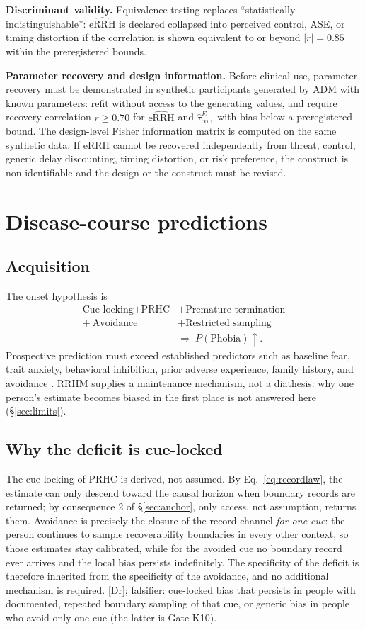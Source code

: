 \documentclass[9pt,twocolumn]{article}
\newcommand{\eRRHhat}{\widehat{\mathrm{eRRH}}}
\newcommand{\tcorr}{\widehat{\tau}^{E}_{\mathrm{corr}}}
\newcommand{\tier}[1]{{\sffamily\scriptsize\color{RRHMSlate}[#1]}}
\begin{document}
\textbf{Discriminant validity.} Equivalence testing \cite{lakens2017} replaces ``statistically indistinguishable'': $\eRRHhat$ is declared collapsed into perceived control, ASE, or timing distortion if the correlation is shown equivalent to or beyond $|r|=0.85$ within the preregistered bounds.

\textbf{Parameter recovery and design information.} Before clinical use, parameter recovery must be demonstrated in synthetic participants generated by ADM with known parameters: refit without access to the generating values, and require recovery correlation $r\ge0.70$ for $\eRRHhat$ and $\tcorr$ with bias below a preregistered bound. The design-level Fisher information matrix is computed on the same synthetic data. If eRRH cannot be recovered independently from threat, control, generic delay discounting, timing distortion, or risk preference, the construct is non-identifiable and the design or the construct must be revised.

\section{Disease-course predictions}
\label{sec:course}
\subsection{Acquisition}
The onset hypothesis is
\begin{align*}
\text{Cue locking}+\text{PRHC}&+\text{Premature termination}\\[-0.1em]
+\ \text{Avoidance}&+\text{Restricted sampling}\\[-0.1em]
&\Rightarrow\ P(\text{Phobia})\uparrow .
\end{align*}
Prospective prediction must exceed established predictors such as baseline fear, trait anxiety, behavioral inhibition, prior adverse experience, family history, and avoidance \cite{trumpf2010incidence}. RRHM supplies a maintenance mechanism, not a diathesis: why one person's estimate becomes biased in the first place is not answered here (\S\ref{sec:limits}).

\subsection{Why the deficit is cue-locked}
\label{sec:cuelock}
The cue-locking of PRHC is derived, not assumed. By Eq.~\ref{eq:recordlaw}, the estimate can only descend toward the causal horizon when boundary records are returned; by consequence 2 of \S\ref{sec:anchor}, only access, not assumption, returns them. Avoidance is precisely the closure of the record channel \emph{for one cue}: the person continues to sample recoverability boundaries in every other context, so those estimates stay calibrated, while for the avoided cue no boundary record ever arrives and the local bias persists indefinitely. The specificity of the deficit is therefore inherited from the specificity of the avoidance, and no additional mechanism is required. \tier{Dr}; falsifier: cue-locked bias that persists in people with documented, repeated boundary sampling of that cue, or generic bias in people who avoid only one cue (the latter is Gate K10).
\end{document}
